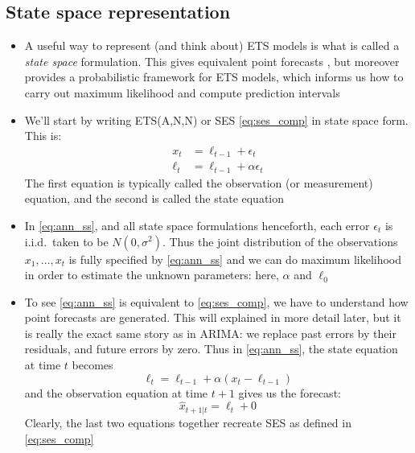 \documentclass{article}
\begin{document}
\subsection{State space representation}

\begin{itemize}
\item A useful way to represent (and think about) ETS models is what is called
  a \emph{state space} formulation. This gives equivalent point forecasts 
  , but moreover provides a probabilistic framework 
  for ETS models, which informs us how to carry out maximum likelihood and
  compute prediction intervals

\item We'll start by writing ETS(A,N,N) or SES \eqref{eq:ses_comp} in state
  space form. This is:   
  \begin{equation}
  \label{eq:ann_ss}
  \begin{aligned}
  x_t &= \ell_{t-1} + \epsilon_t \\
  \ell_t &= \ell_{t-1} + \alpha \epsilon_t
  \end{aligned}
  \end{equation}
  The first equation is typically called the observation (or measurement)
  equation, and the second is called the state equation
  
\item In \eqref{eq:ann_ss}, and all state space formulations henceforth, each
  error $\epsilon_t$ is i.i.d.\ taken to be $N(0, \sigma^2)$. Thus the joint
  distribution of the observations $x_1,\dots,x_t$ is fully specified by
  \eqref{eq:ann_ss} and we can do maximum likelihood in order to estimate the
  unknown parameters: here, $\alpha$ and $\ell_0$ 

\item To see \eqref{eq:ann_ss} is equivalent to \eqref{eq:ses_comp}, we have to
  understand how point forecasts are generated. This will explained in more
  detail later, but it is really the exact same story as in ARIMA: we replace
  past errors by their residuals, and future errors by zero. Thus in
  \eqref{eq:ann_ss}, the state equation at time $t$ becomes    
  \[
  \ell_t = \ell_{t-1} + \alpha (x_t - \ell_{t-1})
  \]
  and the observation equation at time $t+1$ gives us the forecast:
  \[
  \hat{x}_{t+1 | t} = \ell_t + 0
  \]
  Clearly, the last two equations together recreate SES as defined in
  \eqref{eq:ses_comp}    


\end{itemize}
\end{document}
